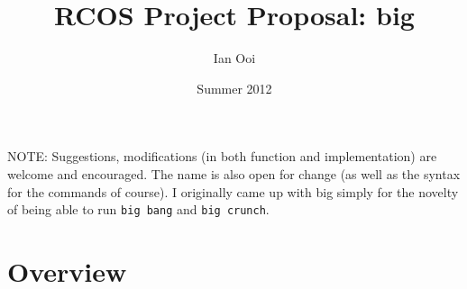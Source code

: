 \documentclass[12pt]{article}
\title{RCOS Project Proposal: big}
\author{Ian Ooi}
\date{Summer 2012}
\begin{document}
    \maketitle
    NOTE: Suggestions, modifications (in both function and implementation) are welcome and encouraged.  The name is also open for change (as well as the syntax for the commands of course).  I originally came up with big simply for the novelty of being able to run \verb+big bang+ and \verb+big crunch+.
    \section{Overview}


\end{document}

